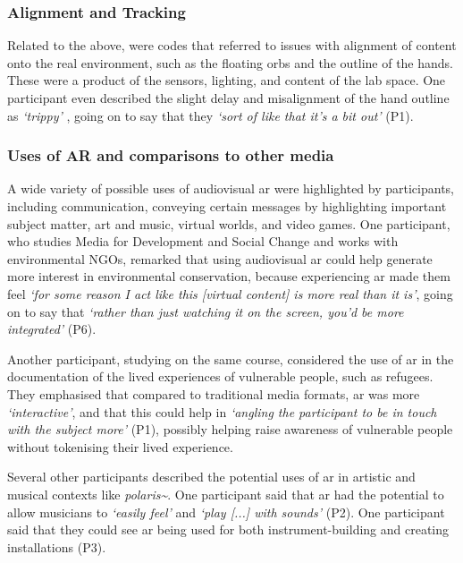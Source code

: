 \subsubsection{Alignment and Tracking}\label{sec: polaris-feedback-adoption-alignment}
Related to the above, were codes that referred to issues with alignment of content onto the real environment, such as the floating orbs and the outline of the hands. These were a product of the sensors, lighting, and content of the lab space. One participant even described the slight delay and misalignment of the hand outline as \textit{`trippy'} , going on to say that they \textit{`sort of like that it's a bit out'} (P1).

\subsubsection{Uses of AR and comparisons to other media}\label{sec: polaris-feedback-adoption-uses}
A wide variety of possible uses of audiovisual \ac{ar} were highlighted by participants, including communication, conveying certain messages by highlighting important subject matter, art and music, virtual worlds, and video games.
One participant, who studies Media for Development and Social Change and works with environmental NGOs, remarked that using audiovisual \ac{ar} could help generate more interest in environmental conservation, because experiencing \ac{ar} made them feel \textit{`for some reason I act like this [virtual content] is more real than it is'}, going on to say that \textit{`rather than just watching it on the screen, you'd be more integrated'} (P6).

Another participant, studying on the same course, considered the use of \ac{ar} in the documentation of the lived experiences of vulnerable people, such as refugees. They emphasised that compared to traditional media formats, \ac{ar} was more \textit{`interactive'}, and that this could help in \textit{`angling the participant to be in touch with the subject more'} (P1), possibly helping raise awareness of vulnerable people without tokenising their lived experience.

Several other participants described the potential uses of \ac{ar} in artistic and musical contexts like \textit{polaris\textasciitilde{}}. One participant said that \ac{ar} had the potential to allow musicians to \textit{`easily feel'} and \textit{`play [...] with sounds'} (P2). One participant said that they could see \ac{ar} being used for both instrument-building and creating installations (P3).

